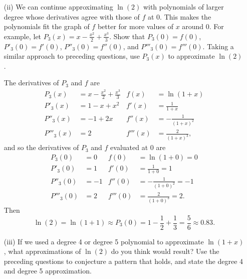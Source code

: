 \begin{pa}
\begin{itemize}
\begin{activitySolution}
\end{activitySolution}

    \item[(ii)] We can continue approximating $\ln(2)$ with polynomials of larger degree whose derivatives agree with those of $f$ at 0. This makes the polynomials fit the graph of $f$ better for more values of $x$ around 0. For example, let $P_3(x) = x - \frac{x^2}{2}+\frac{x^3}{3}$. Show that $P_3(0) = f(0)$, $P'_3(0) = f'(0)$, $P''_3(0) = f''(0)$, and $P'''_3(0) = f'''(0)$. Taking a similar approach to preceding questions, use $P_3(x)$ to approximate $\ln(2)$.

\begin{activitySolution}

The derivatives of $P_3$ and $f$ are
\begin{align*}
P_3(x) &= x-\frac{x^2}{2}+\frac{x^3}{3} & f(x) &= \ln(1+x) \\
P'_3(x) &= 1 - x + x^2  & f'(x) &= \frac{1}{1+x} \\
P''_3(x) &= -1+2x  & f''(x) &= -\frac{1}{(1+x)^2} \\
P'''_3(x) &= 2  & f'''(x) &= \frac{2}{(1+x)^3},
\end{align*}
and so the derivatives of $P_3$ and $f$ evaluated at 0 are
\begin{align*}
P_3(0) &= 0 & f(0) &= \ln(1+0) = 0 \\
P'_3(0) &= 1 & f'(0) &= \frac{1}{1+0} = 1 \\
P''_3(0) &= -1 & f''(0) &= -\frac{1}{(1+0)^2} = -1 \\
P'''_3(0) &= 2 & f'''(0) &= \frac{2}{(1+0)^3} = 2.
\end{align*}
Then
\[\ln(2) = \ln(1+1) \approx P_3(0) = 1 - \frac{1}{2} + \frac{1}{3} = \frac{5}{6} \approx 0.83.\]

\end{activitySolution}

    \item[(iii)]  If we used a degree 4 or degree 5 polynomial to approximate $\ln(1+x)$, what approximations of $\ln(2)$ do you think would result?  Use the preceding questions to conjecture a pattern that holds, and state the degree 4 and degree 5 approximation.

    \end{itemize}

\ea

\end{pa}
\afterpa 